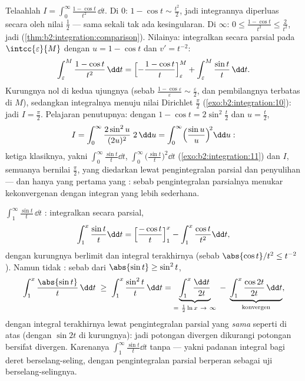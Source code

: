 \begin{example}\label{ex:b2:integration:onecos}
Telaahlah $I = \displaystyle\int_0^{\infty} \frac{1 - \cos
t}{t^2}\,\dd t$. Di $0$: $1 - \cos t \sim \frac{t^2}2$, jadi
integrannya diperluas secara  oleh nilai $\frac12$ --- sama
sekali tak ada kesingularan. Di $\infty$: $0 \leq \frac{1 - \cos t}{t^2}
\leq \frac{2}{t^2}$, jadi  
(\cref{thm:b2:integration:comparison}). Nilainya: integralkan secara
parsial pada $\intcc{\varepsilon}{M}$ dengan $u = 1 - \cos t$ dan $v' =
t^{-2}$:
\[
\int_\varepsilon^M \frac{1 - \cos t}{t^2}\,\dd t
= \Bigl[-\frac{1 - \cos t}{t}\Bigr]_\varepsilon^M
+ \int_\varepsilon^M \frac{\sin t}{t}\,\dd t .
\]
Kurungnya nol di kedua ujungnya (sebab $\frac{1 -
\cos\varepsilon}{\varepsilon} \sim \frac\varepsilon2$, dan pembilangnya
terbatas di $M$), sedangkan integralnya menuju nilai Dirichlet
$\frac\pi2$ (\cref{exo:b2:integration:10}): jadi $I = \frac\pi2$.
Pelajaran penutupnya: dengan $1 - \cos t = 2\sin^2\frac t2$ dan $u =
\frac t2$,
\[
I = \int_0^\infty \frac{2\sin^2 u}{(2u)^2}\;2\,\dd u
= \int_0^\infty \Bigl(\frac{\sin u}{u}\Bigr)^{\!2}\dd u :
\]
ketiga klasiknya, yakni $\int_0^\infty\frac{\sin t}{t}\dd t$,
$\int_0^\infty\bigl(\frac{\sin t}{t}\bigr)^2\dd t$
(\cref{exo:b2:integration:11}) dan $I$, semuanya bernilai
$\frac\pi2$, yang diedarkan lewat pengintegralan parsial dan penyulihan
--- dan hanya yang pertama yang : sebab pengintegralan
parsialnya menukar kekonvergenan  dengan integran yang lebih sederhana.
\end{example}

\begin{example}\label{ex:b2:integration:sint}
$\displaystyle\int_1^{\infty} \frac{\sin t}{t}\,\dd t$ :
integralkan secara parsial,
\[
\int_1^x \frac{\sin t}{t}\dd t
= \Bigl[\frac{-\cos t}{t}\Bigr]_1^x - \int_1^x \frac{\cos
t}{t^2}\dd t ,
\]
dengan kurungnya berlimit dan integral terakhirnya 
 (sebab $\abs{\cos t}/t^2 \leq t^{-2}$). Namun tidak :
sebab dari $\abs{\sin t} \geq \sin^2 t$,
\[
\int_1^x \frac{\abs{\sin t}}{t}\,\dd t
\;\geq\; \int_1^x \frac{\sin^2t}{t}\,\dd t
= \underbrace{\int_1^x \frac{\dd t}{2t}}_{=\ \frac12\ln x
\ \to\ \infty}
\;-\; \underbrace{\int_1^x \frac{\cos 2t}{2t}\,\dd
t}_{\text{konvergen}} ,
\]
dengan integral terakhirnya  lewat pengintegralan parsial yang
\emph{sama} seperti di atas (dengan $\sin 2t$ di kurungnya):
jadi potongan divergen dikurangi potongan  bersifat divergen.
Karenanya $\int_1^\infty\frac{\sin t}{t}\dd t$  tanpa
  --- yakni padanan integral bagi deret
berselang-seling, dengan pengintegralan parsial berperan sebagai
uji berselang-selingnya.
\end{example}

